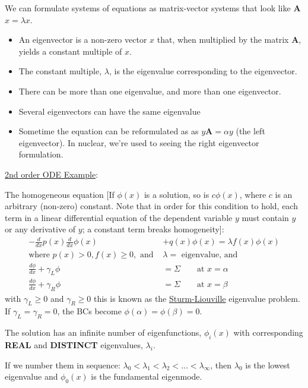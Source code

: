 \documentclass[12pt]{article}
\newcommand{\ve}[1]{\ensuremath{\mathbf{#1}}}
\newcommand{\Macro}{\ensuremath{\Sigma}}
\begin{document}
We can formulate systems of equations as matrix-vector systems that look like \ve{A}$x = \lambda x$. 
\begin{itemize}
\item An eigenvector is a non-zero vector $x$ that, when multiplied by the matrix \ve{A}, yields a constant multiple of $x$. 
\item The constant multiple, $\lambda$, is the eigenvalue corresponding to the eigenvector.
\item There can be more than one eigenvalue, and more than one eigenvector. 
\item Several eigenvectors can have the same eigenvalue
\item Sometime the equation can be reformulated as as $y\ve{A} = \alpha y$ (the left eigenvector). In nuclear, we're used to seeing the right eigenvector formulation.
\end{itemize}

\vspace*{1em}
\noindent \underline{2nd order ODE Example}:

The homogeneous equation [If  $\phi(x)$  is a solution, so is  $c \phi(x)$, where $c$ is an arbitrary (non-zero) constant. Note that in order for this condition to hold, each term in a linear differential equation of the dependent variable $y$ must contain $y$ or any derivative of $y$; a constant term breaks homogeneity]:
%
\begin{align}
-\frac{d}{dx}p(x) \frac{d}{dx}\phi(x) &+ q(x)\phi(x) = \lambda f(x) \phi(x) \nonumber \\
\text{where }p(x) > 0, f(x) \geq 0, \text{ and }& \lambda = \text{ eigenvalue, and}\nonumber \\
\frac{d\phi}{dx} + \gamma_L \phi &= \Macro \qquad \text{at }x=\alpha \nonumber \\
\frac{d\phi}{dx} + \gamma_R \phi &= \Macro \qquad \text{at }x=\beta \nonumber
\end{align}
%
with $\gamma_L \geq 0$ and $\gamma_R \geq 0$ this is known as the \underline{Sturm-Liouville} eigenvalue problem. If $\gamma_L = \gamma_R = 0$, the BCs become $\phi(\alpha) = \phi(\beta) = 0$.

The solution has an infinite number of eigenfunctions, $\phi_i(x)$ with corresponding \textbf{REAL} and \textbf{DISTINCT} eigenvalues, $\lambda_i$. 

If we number them in sequence: $\lambda_0 < \lambda_1 < \lambda_2 < \dots < \lambda_{\infty}$, then $\lambda_0$ is the lowest eigenvalue and $\phi_0(x)$ is the fundamental eigenmode. 
\end{document}
